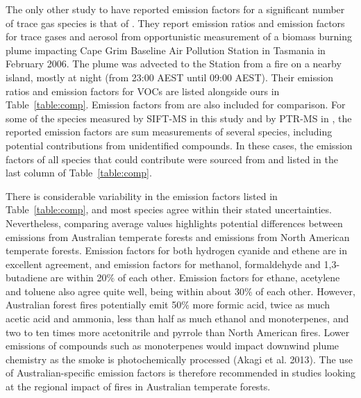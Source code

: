 \documentclass[acp, manuscript]{copernicus}
\begin{document}
The only other study to have reported emission factors for a significant number of trace gas species is that of \citet{Lawson2015}. They report emission ratios and emission factors for trace gases and aerosol from opportunistic measurement of a biomass burning plume impacting Cape Grim Baseline Air Pollution Station in Tasmania in February 2006. The plume was advected to the Station from a fire on a nearby island, mostly at night (from 23:00 AEST until 09:00 AEST). Their emission ratios and emission factors for VOCs are listed alongside ours in Table~\ref{table:comp}. Emission factors from  \citet[Table S4, February 2015 update]{Akagi2011} are also included for comparison. For some of the species measured by SIFT-MS in this study and by PTR-MS in \citet{Lawson2015}, the reported emission factors are sum measurements of several species, including potential contributions from unidentified compounds. In these cases, the emission factors of all species that could contribute were sourced from \citet[Table S4, February 2015 update]{Akagi2011} and listed in the last column of Table~\ref{table:comp}. 

There is considerable variability in the emission factors listed in Table~\ref{table:comp}, and most species agree within their stated uncertainties. Nevertheless, comparing average values highlights potential differences between emissions from Australian temperate forests and emissions from North American temperate forests. Emission  factors for both hydrogen cyanide and ethene are in excellent agreement, and emission factors for methanol, formaldehyde and 1,3-butadiene are within 20$\%$ of each other. Emission factors for ethane, acetylene and toluene also agree quite well, being within about 30$\%$ of each other. However, Australian forest fires potentially emit 50$\%$ more formic acid, twice as much acetic acid and ammonia, less than half as much ethanol and monoterpenes, and two to ten times more acetonitrile and pyrrole than North American fires. Lower emissions of compounds such as monoterpenes would impact downwind plume chemistry as the smoke is photochemically processed (Akagi et al. 2013). The use of Australian-specific emission factors is therefore recommended in studies looking at the regional impact of fires in Australian temperate forests. 
\end{document}

